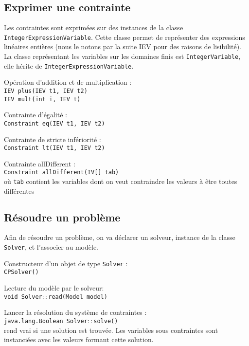 \subsection*{Exprimer une contrainte}

Les contraintes sont exprimées sur des instances de la classe
\texttt{IntegerExpressionVariable}. Cette classe permet de représenter des
expressions linéaires entières (nous le notons par la suite IEV pour des
raisons de lisibilité). La classe représentant les variables sur les domaines
finis est \texttt{IntegerVariable}, elle hérite de
\texttt{IntegerExpressionVariable}.

\noindent Opération d'addition et de multiplication :\\
\texttt{IEV plus(IEV t1, IEV t2)}\\
\texttt{IEV mult(int i, IEV t)}

\noindent Contrainte d'égalité :\\
\texttt{Constraint eq(IEV t1, IEV t2)}

\noindent Contrainte de stricte infériorité :\\
\texttt{Constraint lt(IEV t1, IEV t2)}

\noindent Contrainte allDifferent :\\
\texttt{Constraint allDifferent(IV[] tab)}\\
\indent où \texttt{tab} contient les variables dont on veut contraindre les
        valeurs à être toutes différentes

\subsection*{Résoudre un problème}

Afin de résoudre un problème, on va déclarer un solveur, instance de la classe
\texttt{Solver}, et l'associer au modèle.

Constructeur d'un objet de type \texttt{Solver} :\\
\texttt{CPSolver()}

Lecture du modèle par le solveur:\\
\texttt{void Solver$\colon\colon$read(Model model)}

Lancer la résolution du système de contraintes :\\
\texttt{java.lang.Boolean Solver$\colon\colon$solve()}\\
\indent rend vrai si une solution est trouvée. Les variables sous contraintes
        sont instanciées avec les valeurs formant cette solution.

